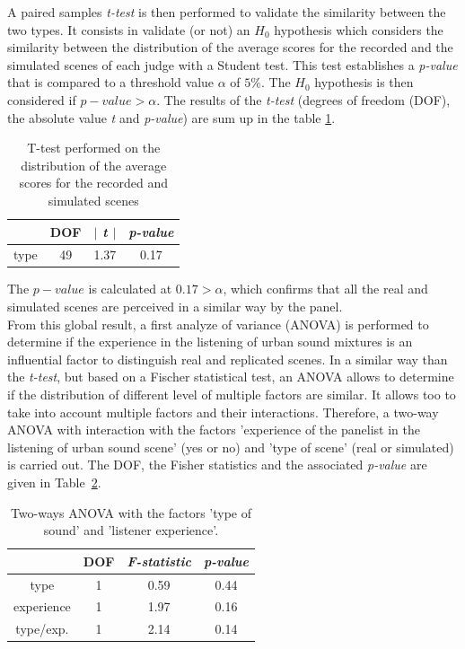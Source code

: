\documentclass[11pt,letter]{article}
\begin{document}
A paired samples \textit{t-test} is then performed to validate the similarity between the two types. It consists in validate (or not) an $H_0$ hypothesis which considers the similarity between the distribution of the average scores for the recorded and the simulated scenes of each judge with a Student test. This test establishes a \textit{p-value} that is compared to a threshold value $\alpha$ of $5\%$. The $H_0$ hypothesis is then considered if $p-value > \alpha$. The results of the \textit{t-test} (degrees of freedom (DOF), the absolute value \textit{t} and \textit{p-value}) are sum up in the table \ref{tab:ttest_type_of_scene}.

\begin{table}[H]
\centering
\begin{tabular}{cccc}
        & DOF & \textit{$\mid$ t $\mid$}    & \textit{p-value} \\ 
\hline
type & 49 & 1.37 &  0.17   \\
\hline
\end{tabular}
\caption{T-test performed on the distribution of the average scores for the recorded and simulated scenes}
\label{tab:ttest_type_of_scene}
\end{table}


The $p-value$ is calculated at $0.17 > \alpha$, which confirms that all the real and simulated scenes are perceived in a similar way by the panel.\\

From this global result, a first analyze of variance (ANOVA) is performed to determine if the experience in the listening of urban sound mixtures is an influential factor to distinguish real and replicated scenes. In a similar way than the \textit{t-test}, but based on a Fischer statistical test, an ANOVA allows to determine if the distribution of different level of multiple factors are similar. It allows too to take into account multiple factors and their interactions. Therefore, a two-way ANOVA with interaction with the factors 'experience of the panelist in the listening of urban sound scene' (yes or no) and 'type of scene' (real or simulated) is carried out.  The DOF, the Fisher statistics and the associated \textit{p-value} are given in Table~\ref{tab:ANOVA_type_exp}.\\

\begin{table}[h]
\centering
\begin{tabular}{cccc}
        & DOF & \textit{F-statistic}    & \textit{p-value} \\ 
\hline
type & 1 & 0.59 & 0.44 \\
\hline
experience  & 1 & 1.97 & 0.16 \\ 
\hline
type/exp. & 1 & 2.14 & 0.14 \\
\hline
\end{tabular}
\caption{Two-ways ANOVA with the factors 'type of sound' and 'listener experience'.}
\label{tab:ANOVA_type_exp}
\end{table}
\end{document}
